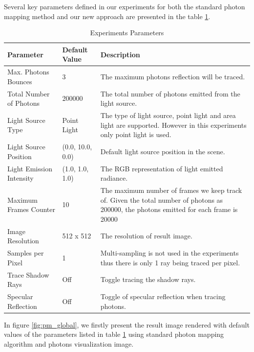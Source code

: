 Several key parameters defined in our experiments for both the standard photon mapping method and our new approach are presented in the table \ref{tab:expr_params}.

\begin{table}[t]
\caption{Experiments Parameters}
\centering
	\renewcommand{\arraystretch}{1.2}
	\begin{tabular}{p{5cm} p{3cm} p{5cm}}
	{\bf Parameter}  				& 		{\bf Default Value} 		&		{\bf Description} \\
	\hline
	Max. Photons Bounces	& 		3					&		The maximum photons reflection will be traced. \\
	\hline 					
	Total Number of Photons 	& 		200000				&		The total number of photons emitted from the light 																	source. \\
	\hline
	Light Source Type			& 		Point Light			& 		The type of light source, point light and area light
																are supported. However in this experiments only point 																	light is used. \\
	\hline
	Light Source Position 		& 	 	(0.0, 10.0, 0.0)		&		Default light source position in the scene. \\
	\hline
	Light Emission Intensity	&		(1.0, 1.0, 1.0)		&		The RGB representation of light emitted radiance.\\
	\hline
	Maximum Frames Counter 	& 		10 					& 		The maximum number of frames we keep track of. Given 																	the total number of photons as 200000, the photons 																	emitted for each frame is 20000\\
	\hline
	Image Resolution 			&		512 x 512				&		The resolution of result image. \\
	\hline
	Samples per Pixel			& 		1 					& 		Multi-sampling is not used in the experiments thus 																	there is only 1 ray being traced per pixel.\\
	\hline
	Trace Shadow Rays			&		Off					& 		Toggle tracing the shadow rays. \\
	\hline
	Specular Reflection		&		Off					&		Toggle of specular reflection when tracing photons. \\
	\hline
	\end{tabular}
\label{tab:expr_params}
\end{table}

In figure \ref{fig:pm_global}, we firstly present the result image rendered with default values of the parameters listed in table \ref{tab:expr_params} using standard photon mapping algorithm and photons visualization image.

